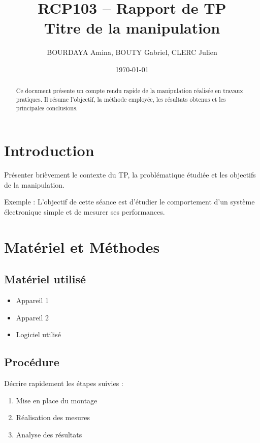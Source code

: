\documentclass[11pt,a4paper]{article}
\title{\textbf{RCP103 -- Rapport de TP}\\Titre de la manipulation}
\author{BOURDAYA Amina, BOUTY Gabriel, CLERC Julien}
\date{\today}
\begin{document}
\maketitle

\bigskip

\begin{abstract}
Ce document présente un compte rendu rapide de la manipulation réalisée en travaux pratiques. Il résume l'objectif, la méthode employée, les résultats obtenus et les principales conclusions.
\end{abstract}

\bigskip

\section{Introduction}

Présenter brièvement le contexte du TP, la problématique étudiée et les objectifs de la manipulation.

Exemple :
L'objectif de cette séance est d'étudier le comportement d'un système électronique simple et de mesurer ses performances.

\section{Matériel et Méthodes}

\subsection{Matériel utilisé}

\begin{itemize}
    \item Appareil 1
    \item Appareil 2
    \item Logiciel utilisé
\end{itemize}

\subsection{Procédure}

Décrire rapidement les étapes suivies :

\begin{enumerate}
    \item Mise en place du montage
    \item Réalisation des mesures
    \item Analyse des résultats
\end{enumerate}
\end{document}
